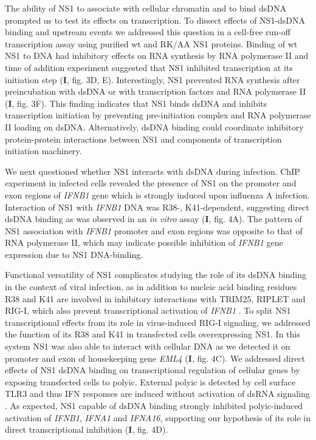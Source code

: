 		The ability of NS1 to associate with cellular chromatin and to bind dsDNA prompted us to test its effects on transcription. To dissect effects of  NS1-dsDNA binding and upstream events we addressed this question in a cell-free run-off transcription assay using purified \gls{wt} and RK/AA NS1 proteins. Binding of wt NS1 to DNA had inhibitory effects on RNA synthesis by RNA polymerase II and time of addition experiment suggested that NS1 inhibited transcription at its initiation step (\textbf{I}, fig. 3D, E). Interestingly, NS1 prevented RNA synthesis after preincubation  with dsDNA or with transcription factors and RNA polymerase II (\textbf{I}, fig. 3F). This finding indicates that NS1 binds dsDNA and inhibits transcription initiation by preventing pre-initiation complex and RNA polymerase II loading on dsDNA. Alternatively, dsDNA binding could coordinate inhibitory protein-protein interactions between NS1 and components of transcription initiation machinery. 
		
		We next questioned whether NS1 interacts with dsDNA during infection. \Gls{ChIP} experiment in infected cells revealed the presence of NS1 on the promoter and exon regions of \textit{IFNB1} gene which is strongly induced upon influenza A infection. Interaction of NS1 with \textit{IFNB1} DNA was R38-, K41-dependent, suggesting direct dsDNA binding as was observed in an \textit{in vitro} assay (\textbf{I}, fig. 4A). The pattern of NS1 association with \textit{IFNB1} promoter and exon regions was opposite to that of RNA polymerase II, which may indicate possible inhibition of \textit{IFNB1} gene expression due to NS1 DNA-binding. 
		
		Functional versatility of NS1 complicates studying the role of its dsDNA binding in the context of viral infection, as in addition to nucleic acid binding residues R38 and K41 are involved in inhibitory interactions with TRIM25, RIPLET and \gls{RIG-I}, which also prevent transcriptional activation of \textit{IFNB1} \parencite{Gack2009, Rajsbaum2012}. To split NS1 transcriptional effects from its role in virus-induced \gls{RIG-I} signaling, we addressed the function of its R38 and K41 in transfected cells overexpressing NS1. In this system NS1 was also able to interact with cellular DNA as we detected it on promoter and exon of housekeeping gene \textit{EML4} (\textbf{I}, fig. 4C). We addressed direct effects of NS1 dsDNA binding on transcriptional regulation of cellular genes by exposing transfected cells to \gls{polyic}. External \gls{polyic} is detected by cell surface \gls{TLR}3  and thus \gls{IFN} responses are induced without activation of dsRNA signaling \parencite{Karpala2005}. As expected, NS1 capable of dsDNA binding strongly inhibited \gls{polyic}-induced activation of \textit{IFNB1}, \textit{IFNA1} and \textit{IFNA16}, supporting our hypothesis of its role in direct transcriptional inhibition (\textbf{I}, fig. 4D).
		

